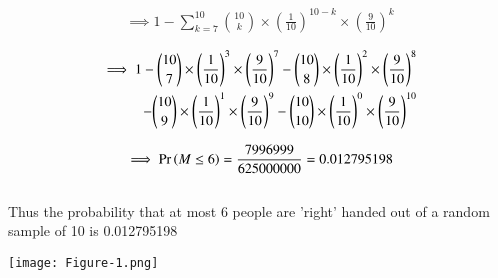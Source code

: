 \documentclass[journal,12pt,twocolumn]{IEEEtran}
\begin{document}
\begin{align}
\implies 1 - \sum_{k=7}^{10} {{10}\choose{k}} \times \left(\frac{1}{10}\right)^{10-k} \times \left(\frac{9}{10}\right)^{k}\label{0.0.5}
\end{align}

\begin{align}
\begin{split}
\implies 1 - {{10}\choose{7}} \times \left(\frac{1}{10}\right)^{3} \times \left(\frac{9}{10}\right)^{7} - {{10}\choose{8}} \times \left(\frac{1}{10}\right)^{2} \times \left(\frac{9}{10}\right)^{8}
\bigskip\\
-{{10}\choose{9}} \times \left(\frac{1}{10}\right)^{1} \times \left(\frac{9}{10}\right)^{9} - {{10}\choose{10}} \times \left(\frac{1}{10}\right)^{0} \times \left(\frac{9}{10}\right)^{10}\label{0.0.6}
\end{split}
\end{align}

\begin{align}
\implies \Pr\left(M \leq 6\right) = \frac{7996999}{625000000} = 0.012795198\notag
\end{align}
\bigskip\\
Thus the probability that at most 6 people are 'right' handed out of a random sample of 10 is 0.012795198 
\pagebreak

\texttt{[image: Figure-1.png]}
\end{document}
